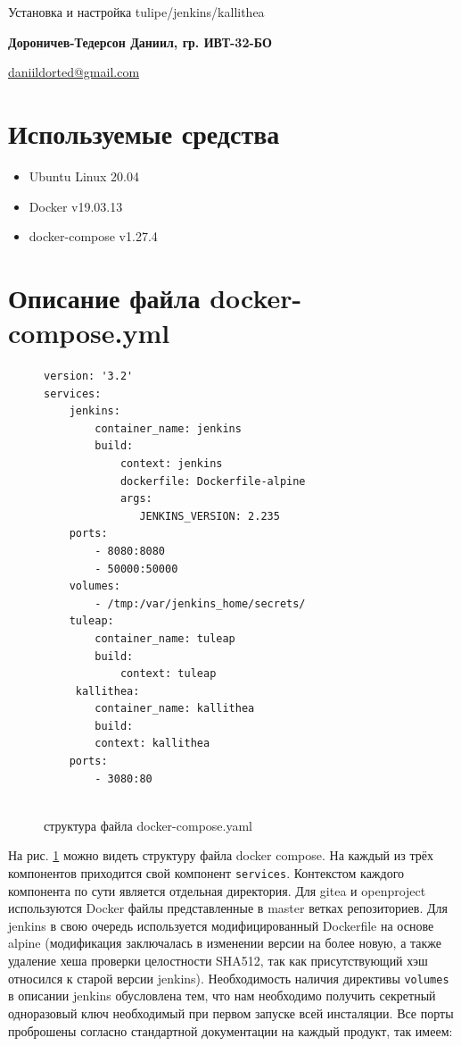 \documentclass[a4paper]{extarticle}
\begin{document}
\begin{center}
        
    \vspace{0.4cm}
    \large
    Установка и настройка tulipe/jenkins/kallithea
        
    \vspace{0.4cm}
    \textbf{Дороничев-Тедерсон Даниил, гр. ИВТ-32-БО}
       
    \vspace{0.3cm}
    \href{mailto:daniildorted@gmail.com}{daniildorted@gmail.com}
\end{center}

\section{Используемые средства}

\begin{itemize}
\item Ubuntu Linux 20.04
\item Docker v19.03.13
\item docker-compose v1.27.4
\end{itemize}

\section{Описание файла docker-compose.yml}

\begin{figure}[h!]
\begin{verbatim}
version: '3.2'
services:
    jenkins:
        container_name: jenkins
        build:
            context: jenkins
            dockerfile: Dockerfile-alpine
            args:
               JENKINS_VERSION: 2.235
    ports:
        - 8080:8080
        - 50000:50000
    volumes:
        - /tmp:/var/jenkins_home/secrets/
    tuleap:
        container_name: tuleap
        build:
            context: tuleap
     kallithea:
        container_name: kallithea
        build:
        context: kallithea
    ports:
        - 3080:80
        
\end{verbatim}
\caption{структура файла docker-compose.yaml}
\label{fig:dcy}
\end{figure}

На рис. \ref{fig:dcy} можно видеть структуру файла docker compose. На каждый из трёх компонентов приходится свой компонент \texttt{services}. Контекстом каждого компонента по сути является отдельная директория. Для gitea и openproject используются Docker файлы представленные в master ветках репозиториев. Для jenkins в свою очередь используется модифицированный Dockerfile на основе alpine (модификация заключалась в изменении версии на более новую, а также удаление хеша  проверки целостности SHA512, так как присутствующий хэш относился к старой версии jenkins). Необходимость наличия директивы \texttt{volumes} в описании jenkins обусловлена тем, что нам необходимо получить секретный одноразовый ключ необходимый при первом запуске всей	инсталяции.
Все порты проброшены согласно стандартной документации на каждый продукт, так имеем:
\end{document}
